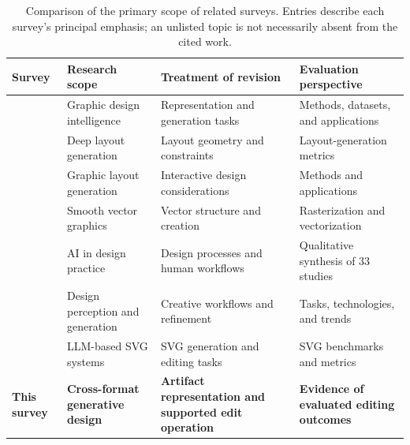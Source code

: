 \begin{table}[t]
\centering
\caption{Comparison of the primary scope of related surveys.
Entries describe each survey's principal emphasis; an unlisted topic is not necessarily absent from the cited work.}
\label{tab:surveys}
\small
\renewcommand{\arraystretch}{1.12}
\begin{tabularx}{\textwidth}{@{}p{}p{}p{}X@{}}
\toprule
\textbf{Survey} & \textbf{Research scope} & \textbf{Treatment of revision} & \textbf{Evaluation perspective}\\
\midrule
\citet{huang2023survey} & Graphic design intelligence & Representation and generation tasks & Methods, datasets, and applications\\
\citet{shi2023layoutsurvey} & Deep layout generation & Layout geometry and constraints & Layout-generation metrics\\
\citet{liu2024graphiclayoutsurvey} & Graphic layout generation & Interactive design considerations & Methods and applications\\
\citet{tian2024vectorsurvey} & Smooth vector graphics & Vector structure and creation & Rasterization and vectorization\\
\citet{li2024criticalsurvey} & AI in design practice & Design processes and human workflows & Qualitative synthesis of 33 studies\\
\citet{zou2025fragment} & Design perception and generation & Creative workflows and refinement & Tasks, technologies, and trends\\
\citet{malashenko2025svgreview} & LLM-based SVG systems & SVG generation and editing tasks & SVG benchmarks and metrics\\
\midrule
\textbf{This survey} & \textbf{Cross-format generative design} & \textbf{Artifact representation and supported edit operation} & \textbf{Evidence of evaluated editing outcomes}\\
\bottomrule
\end{tabularx}
\end{table}

